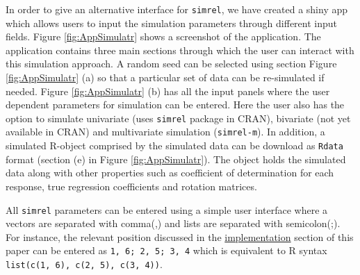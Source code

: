 \documentclass[review]{elsarticle}
\theoremstyle{definition}
\theoremstyle{definition}
\theoremstyle{remark}
\begin{document}
In order to give an alternative interface for \texttt{simrel}, we have
created a shiny app which allows users to input the simulation
parameters through different input fields. Figure \ref{fig:AppSimulatr}
shows a screenshot of the application. The application contains three
main sections through which the user can interact with this simulation
approach. A random seed can be selected using section Figure
\ref{fig:AppSimulatr} (a) so that a particular set of data can be
re-simulated if needed. Figure \ref{fig:AppSimulatr} (b) has all the
input panels where the user dependent parameters for simulation can be
entered. Here the user also has the option to simulate univariate (uses
\texttt{simrel} package in CRAN), bivariate (not yet available in CRAN)
and multivariate simulation (\texttt{simrel-m}). In addition, a
simulated R-object comprised by the simulated data can be download as
\texttt{Rdata} format (section (e) in Figure \ref{fig:AppSimulatr}). The
object holds the simulated data along with other properties such as
coefficient of determination for each response, true regression
coefficients and rotation matrices.

All \texttt{simrel} parameters can be entered using a simple user
interface where a vectors are separated with comma(,) and lists are
separated with semicolon(;). For instance, the relevant position
discussed in the \protect\hyperlink{implementation}{implementation}
section of this paper can be entered as \texttt{1,\ 6;\ 2,\ 5;\ 3,\ 4}
which is equivalent to R syntax
\texttt{list(c(1,\ 6),\ c(2,\ 5),\ c(3,\ 4))}.
\end{document}
